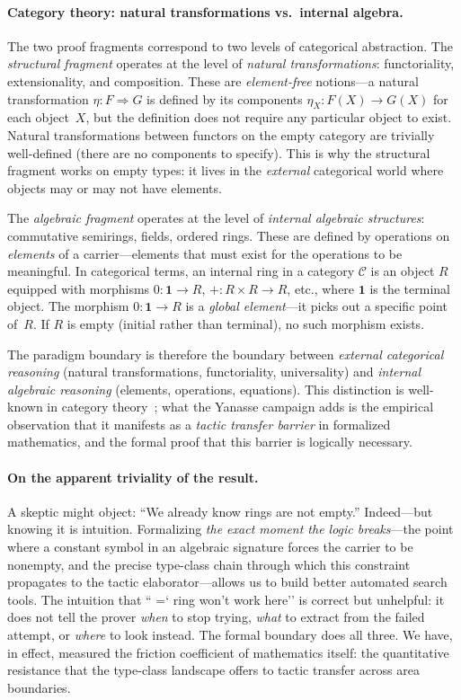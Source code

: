 \documentclass[11pt]{article}
\renewcommand{\texttt}[1]{%
  \begingroup\ttfamily\hyphenchar\font=`\-\relax
  \def\_{\textunderscore\discretionary{}{}{}}%
  #1\endgroup}
\theoremstyle{definition}
\theoremstyle{remark}
\begin{document}
\paragraph{Category theory: natural transformations vs.\ internal
algebra.}
The two proof fragments correspond to two levels of categorical
abstraction.  The \emph{structural fragment} operates at the level
of \emph{natural transformations}: functoriality, extensionality,
and composition.  These are \emph{element-free} notions---a natural
transformation $\eta : F \Rightarrow G$ is defined by its components
$\eta_X : F(X) \to G(X)$ for each object~$X$, but the definition
does not require any particular object to exist.  Natural
transformations between functors on the empty category are trivially
well-defined (there are no components to specify).  This is why
the structural fragment works on empty types: it lives in the
\emph{external} categorical world where objects may or may not have
elements.

The \emph{algebraic fragment} operates at the level of
\emph{internal algebraic structures}: commutative semirings, fields,
ordered rings.  These are defined by operations on \emph{elements}
of a carrier---elements that must exist for the operations to be
meaningful.  In categorical terms, an internal ring in a category
$\mathcal{C}$ is an object $R$ equipped with morphisms
$0 : \mathbf{1} \to R$, $+ : R \times R \to R$, etc., where
$\mathbf{1}$ is the terminal object.  The morphism
$0 : \mathbf{1} \to R$ is a \emph{global element}---it picks out a
specific point of~$R$.  If $R$ is empty (initial rather than
terminal), no such morphism exists.

The paradigm boundary is therefore the boundary between
\emph{external categorical reasoning} (natural transformations,
functoriality, universality) and \emph{internal algebraic reasoning}
(elements, operations, equations).  This distinction is well-known
in category theory~\cite{maclane1971, borceux1994}; what the Yanasse
campaign adds is the empirical observation that it manifests as a
\emph{tactic transfer barrier} in formalized mathematics, and the
formal proof that this barrier is logically necessary.

\paragraph{On the apparent triviality of the result.}
A skeptic might object: ``We already know rings are not empty.''
Indeed---but knowing it is intuition.  Formalizing \emph{the exact
moment the logic breaks}---the point where a constant symbol in an
algebraic signature forces the carrier to be nonempty, and the
precise type-class chain through which this constraint propagates
to the tactic elaborator---allows us to build better automated
search tools.  The intuition that ``\texttt{ring} won't work here''
is correct but unhelpful: it does not tell the prover \emph{when}
to stop trying, \emph{what} to extract from the failed attempt, or
\emph{where} to look instead.  The formal boundary does all three.
We have, in effect, measured the friction coefficient of mathematics
itself: the quantitative resistance that the type-class landscape
offers to tactic transfer across area boundaries.
\end{document}
